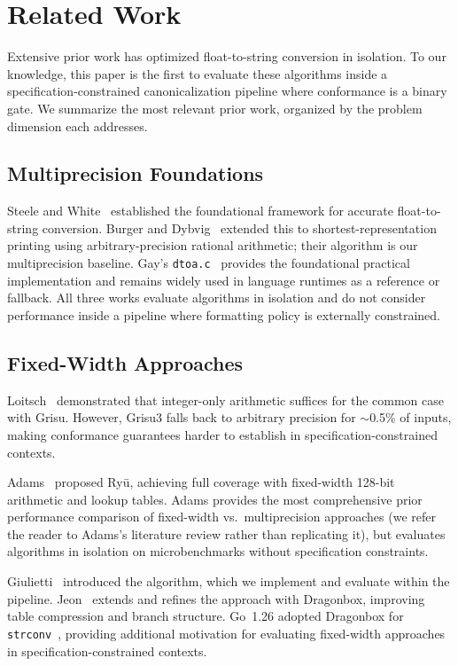 \section{Related Work}
\label{sec:related-work}

Extensive prior work has optimized float-to-string conversion in
isolation.  To our knowledge, this paper is the first to evaluate these algorithms
inside a specification-constrained canonicalization pipeline where
conformance is a binary gate.  We summarize the most relevant prior work, organized by
the problem dimension each addresses.

\subsection{Multiprecision Foundations}

Steele and White~\cite{steele1990how} established the foundational
framework for accurate float-to-string conversion.
Burger and Dybvig~\cite{burger1996printing} extended this to
shortest-representation printing using arbitrary-precision
rational arithmetic; their algorithm is our multiprecision baseline.
Gay's \texttt{dtoa.c}~\cite{gay1990dtoa} provides the foundational
practical implementation and remains widely used in language runtimes as
a reference or fallback.  All three works evaluate algorithms in isolation and
do not consider performance inside a pipeline where formatting policy is
externally constrained.

\subsection{Fixed-Width Approaches}

Loitsch~\cite{loitsch2010grisu} demonstrated that integer-only arithmetic
suffices for the common case with Grisu.  However, Grisu3 falls back to
arbitrary precision for $\sim$0.5\% of inputs, making conformance
guarantees harder to establish in specification-constrained contexts.

Adams~\cite{adams2018ryu} proposed Ry\=u, achieving full coverage with
fixed-width 128-bit arithmetic and lookup tables.  Adams provides the
most comprehensive prior performance comparison of fixed-width vs.\
multiprecision approaches (we refer the reader to Adams's literature
review rather than replicating it), but evaluates algorithms in isolation
on microbenchmarks without specification constraints.

Giulietti~\cite{giulietti2022schubfach} introduced the \schubfach
algorithm, which we implement and evaluate within the \rfcjcs pipeline.
Jeon~\cite{jeon2021dragonbox} extends and refines the \schubfach approach
with Dragonbox, improving table compression and branch structure.  Go~1.26
adopted Dragonbox for \texttt{strconv}~\cite{godragonboxcl}, providing
additional motivation for evaluating fixed-width approaches in
specification-constrained contexts.

